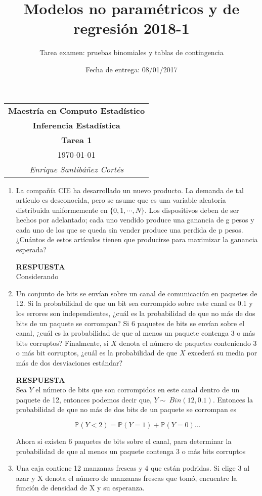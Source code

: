 \documentclass[11pt,letterpaper]{article}
\title{Modelos no paramétricos y de regresión 2018-1}
\author{Tarea examen: pruebas binomiales y tablas de contingencia}
\date{Fecha de entrega: 08/01/2017}
\newcommand{\mP}{\mathbb{P}}
\newcommand{\res}{\textbf{RESPUESTA}\\}
\begin{document}
\begin{table}[ht]
\centering
\begin{tabular}{c}
\textbf{Maestría en Computo Estadístico}\\
\textbf{Inferencia Estadística} \\
\textbf{Tarea 1}\\
\today \\
\emph{Enrique Santibáñez Cortés}
\end{tabular}
\end{table}

\begin{enumerate}

\item La compañía CIE ha desarrollado un nuevo producto. La demanda de tal artículo es desconocida, pero se asume que es una variable aleatoria distribuida uniformemente en $\{0, 1, \cdots, N \}$.
Los dispositivos deben de ser hechos por adelantado; cada uno vendido produce una ganancia de g pesos y cada uno de los que se queda sin vender produce una perdida de p pesos.
¿Cuántos de estos artículos tienen que producirse para maximizar la ganancia esperada?

\res

Considerando

\item Un conjunto de bits se envían sobre un canal de comunicación en paquetes de 12. Si la probabilidad de que un bit sea corrompido sobre este canal es 0.1 y los errores son independientes,
¿cuál es la probabilidad de que no más de dos bits de un paquete se corrompan? Si 6 paquetes
de bits se envían sobre el canal, ¿cuál es la probabilidad de que al menos un paquete contenga 3 o más bits corruptos? Finalmente, si $X$ denota el número de paquetes conteniendo 3 o más bit corruptos, ¿cuál es la probabilidad de que $X$ excederá su media por más de dos desviaciones estándar? 

\res

Sea $Y$ el número de bits que son corrompidos en este canal dentro de un paquete de 12, entonces podemos decir que, $Y\sim \ Bin(12,0.1)$. Entonces la probabilidad de que no más de dos bits de un paquete se corrompan es

$$\mP(Y<2)= \mP(Y=1)+\mP(Y=0)...$$

Ahora si existen 6 paquetes de bits sobre el canal, para determinar la probabilidad de que al menos un paquete contenga 3 o más bits corruptos

\item Una caja contiene 12 manzanas frescas y 4 que están podridas. Si elige 3 al azar y X denota el
número de manzanas frescas que tomó, encuentre la función de densidad de X y su esperanza.


\end{enumerate}
\end{document}
